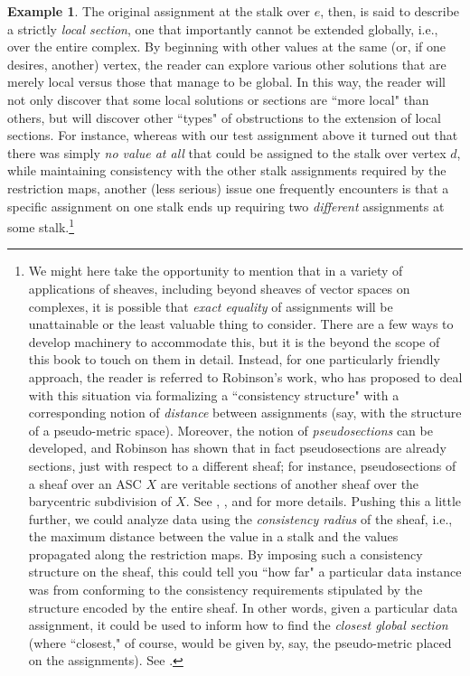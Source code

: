 \documentclass[11pt]{book}
\theoremstyle{definition}
\newtheorem{example}{Example}[section]
\theoremstyle{definition}
\theoremstyle{definition}
\theoremstyle{theorem}
\theoremstyle{definition}
\begin{document}
\begin{example}
		The original assignment at the stalk over $e$, then, is said to describe a strictly \textit{local section}, one that importantly cannot be extended globally, i.e., over the entire complex. By beginning with other values at the same (or, if one desires, another) vertex, the reader can explore various other solutions that are merely local versus those that manage to be global. In this way, the reader will not only discover that some local solutions or sections are ``more local" than others, but will discover other ``types" of obstructions to the extension of local sections. For instance, whereas with our test assignment above it turned out that there was simply \textit{no value at all} that could be assigned to the stalk over vertex $d$, while maintaining consistency with the other stalk assignments required by the restriction maps, another (less serious) issue one frequently encounters is that a specific assignment on one stalk ends up requiring two \textit{different} assignments at some stalk.\footnote{We might here take the opportunity to mention that in a variety of applications of sheaves, including beyond sheaves of vector spaces on complexes, it is possible that \textit{exact equality} of assignments will be unattainable or the least valuable thing to consider. There are a few ways to develop machinery to accommodate this, but it is the beyond the scope of this book to touch on them in detail. Instead, for one particularly friendly approach, the reader is referred to Robinson's work, who has proposed to deal with this situation via formalizing a ``consistency structure" with a corresponding notion of \textit{distance} between assignments (say, with the structure of a pseudo-metric space). Moreover, the notion of \textit{pseudosections} can be developed, and Robinson has shown that in fact pseudosections are already sections, just with respect to a different sheaf; for instance, pseudosections of a sheaf over an ASC $X$ are veritable sections of another sheaf over the barycentric subdivision of $X$. See \cite{robinson_pseudosections_2015}, \cite{robinson_sheaves_2016}, and \cite{praggastis_maximal_2016} for more details. Pushing this a little further, we could analyze data using the \textit{consistency radius} of the sheaf, i.e., the maximum distance between the value in a stalk and the values propagated along the restriction maps. By imposing such a consistency structure on the sheaf, this could tell you ``how far" a particular data instance was from conforming to the consistency requirements stipulated by the structure encoded by the entire sheaf. In other words, given a particular data assignment, it could be used to inform how to find the \textit{closest global section} (where ``closest," of course, would be given by, say, the pseudo-metric placed on the assignments). See \cite{robinson_assignments_2018}.} \par 

\end{example}
\end{document}
